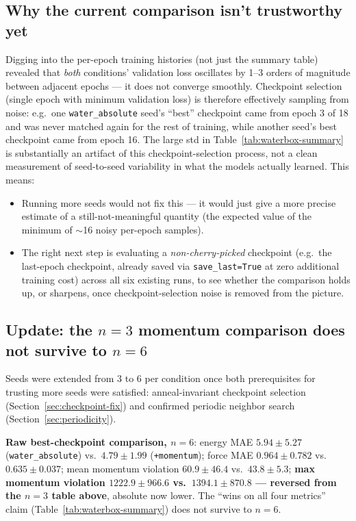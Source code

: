 \documentclass[11pt]{article}
\begin{document}
\subsection{Why the current comparison isn't trustworthy yet}
\label{sec:caveats}

Digging into the per-epoch training histories (not just the summary table)
revealed that \emph{both} conditions' validation loss oscillates by 1--3
orders of magnitude between adjacent epochs --- it does not converge
smoothly. Checkpoint selection (single epoch with minimum validation loss)
is therefore effectively sampling from noise: e.g.\ one
\texttt{water\_absolute} seed's ``best'' checkpoint came from epoch 3 of 18
and was never matched again for the rest of training, while another seed's
best checkpoint came from epoch 16. The large std in
Table~\ref{tab:waterbox-summary} is substantially an artifact of this
checkpoint-selection process, not a clean measurement of seed-to-seed
variability in what the models actually learned. This means:
\begin{itemize}
  \item Running more seeds would not fix this --- it would just give a more
  precise estimate of a still-not-meaningful quantity (the expected value of
  the minimum of $\sim$16 noisy per-epoch samples).
  \item The right next step is evaluating a \emph{non-cherry-picked}
  checkpoint (e.g.\ the last-epoch checkpoint, already saved via
  \texttt{save\_last=True} at zero additional training cost) across all six
  existing runs, to see whether the comparison holds up, or sharpens, once
  checkpoint-selection noise is removed from the picture.
\end{itemize}

\subsection{Update: the $n=3$ momentum comparison does not survive to $n=6$}
\label{sec:n6-update}

Seeds were extended from 3 to 6 per condition once both prerequisites for
trusting more seeds were satisfied: anneal-invariant checkpoint selection
(Section~\ref{sec:checkpoint-fix}) and confirmed periodic neighbor search
(Section~\ref{sec:periodicity}).

\textbf{Raw best-checkpoint comparison, $n=6$}: energy MAE
$5.94\pm5.27$ (\texttt{water\_absolute}) vs.\ $4.79\pm1.99$
(\texttt{+momentum}); force MAE $0.964\pm0.782$ vs.\ $0.635\pm0.037$; mean
momentum violation $60.9\pm46.4$ vs.\ $43.8\pm5.3$; \textbf{max momentum
violation $1222.9\pm966.6$ vs.\ $1394.1\pm870.8$ --- reversed from the
$n=3$ table above}, absolute now lower. The ``wins on all four metrics''
claim (Table~\ref{tab:waterbox-summary}) does not survive to $n=6$.
\end{document}
